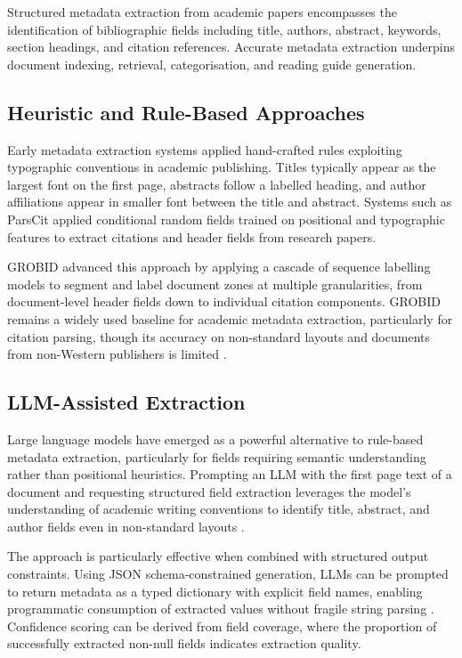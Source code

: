\documentclass[12pt,a4paper]{report}
\begin{document}
Structured metadata extraction from academic papers encompasses 
the identification of bibliographic fields including title, 
authors, abstract, keywords, section headings, and citation 
references. Accurate metadata extraction underpins document 
indexing, retrieval, categorisation, and reading guide 
generation.

\subsection{Heuristic and Rule-Based Approaches}

Early metadata extraction systems applied hand-crafted rules 
exploiting typographic conventions in academic publishing. 
Titles typically appear as the largest font on the first page, 
abstracts follow a labelled heading, and author affiliations 
appear in smaller font between the title and abstract. 
Systems such as ParsCit \cite{councill2008} applied 
conditional random fields trained on positional and 
typographic features to extract citations and header fields 
from research papers.

GROBID \cite{lopez2009} advanced this approach by applying 
a cascade of sequence labelling models to segment and label 
document zones at multiple granularities, from document-level 
header fields down to individual citation components. GROBID 
remains a widely used baseline for academic metadata extraction, 
particularly for citation parsing, though its accuracy on 
non-standard layouts and documents from non-Western publishers 
is limited \cite{tkaczyk2018}.

\subsection{LLM-Assisted Extraction}

Large language models have emerged as a powerful alternative 
to rule-based metadata extraction, particularly for fields 
requiring semantic understanding rather than positional 
heuristics. Prompting an LLM with the first page text of a 
document and requesting structured field extraction leverages 
the model's understanding of academic writing conventions to 
identify title, abstract, and author fields even in 
non-standard layouts \cite{wei2022}.

The approach is particularly effective when combined with 
structured output constraints. Using JSON schema-constrained 
generation, LLMs can be prompted to return metadata as a 
typed dictionary with explicit field names, enabling 
programmatic consumption of extracted values without fragile 
string parsing \cite{openai2023}. Confidence scoring can be 
derived from field coverage, where the proportion of 
successfully extracted non-null fields indicates extraction 
quality.
\end{document}
